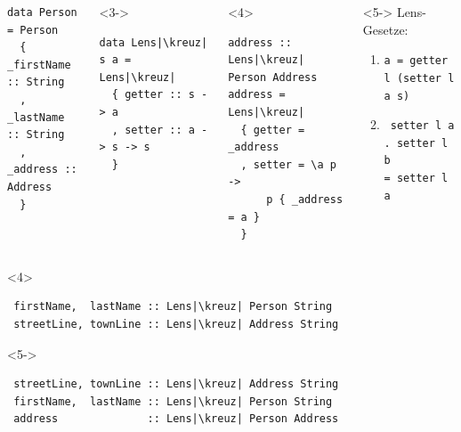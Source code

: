 \documentclass{beamer}
\newcommand{\kreuz}{$\,^\dag$} %
\begin{document}
\begin{frame}[fragile]
\begin{columns}[t]
\begin{visibleenv}
\begin{verbatim}
data Person = Person
  { _firstName :: String
  , _lastName :: String
  , _address :: Address
  }
\end{verbatim}
    \end{visibleenv}
    \begin{visibleenv}<3->
\begin{verbatim}
data Lens|\kreuz| s a = Lens|\kreuz|
  { getter :: s -> a
  , setter :: a -> s -> s
  }
\end{verbatim}
    \end{visibleenv}
    \begin{onlyenv}<4>
\begin{verbatim}
address :: Lens|\kreuz| Person Address
address = Lens|\kreuz|
  { getter = _address
  , setter = \a p ->
      p { _address = a }
  }
\end{verbatim}
    \end{onlyenv}
    \begin{onlyenv}<5->
      Lens-Gesetze:
      \begin{enumerate}
        \small
        \item \texttt{a = getter l (setter l a s)}
        \item \texttt{  setter l a . setter l b} \\
        \texttt{= setter l a}
      \end{enumerate}
    \end{onlyenv}
  \end{columns}
\begin{onlyenv}<4>
\begin{verbatim}
 firstName,  lastName :: Lens|\kreuz| Person String
 streetLine, townLine :: Lens|\kreuz| Address String
\end{verbatim}
\end{onlyenv}
\begin{onlyenv}<5->
\begin{verbatim}
 streetLine, townLine :: Lens|\kreuz| Address String
 firstName,  lastName :: Lens|\kreuz| Person String
 address              :: Lens|\kreuz| Person Address
\end{verbatim}
\end{onlyenv}
\end{frame}
\end{document}
